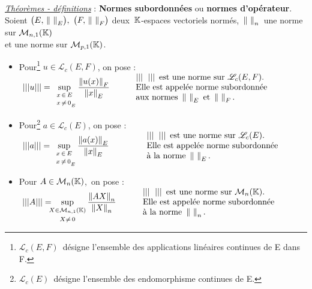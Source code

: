 \underline{\emph{Théorèmes - définitions}} : \textbf{Normes subordonnées} ou \textbf{normes d'opérateur}.\vspace{0.1cm}\\
Soient \(\bigl(E,\,\norm{\ }_E\bigr),\ \bigl(F,\,\norm{\ }_F\bigr)\) deux \(\,\mathbb{K}\)-espaces vectoriels normés, \(\displaystyle\,\left\lVert\ \right\rVert_n\,\) une norme sur \(\mathcal{M}_{n,1}(\mathbb{K})\)\vspace{0.1cm}\\
et \normtxt{\ } une norme sur \(\mathcal{M}_{p,1}(\mathbb{K})\).
\begin{itemize}[leftmargin=0cm, label=•]
    \item Pour\footnote{\(\mathscr{L}_c(E,F)\,\) désigne l'ensemble des applications linéaires continues de E dans F.} \(u\in \mathscr{L}_c(E,F)\), on pose : \(\displaystyle \ \lvert\lvert\lvert u \rvert\rvert\rvert=\sup_{\substack{x\,\in\, E\vspace{0.1cm} \\ \ \, x\,\neq\, 0_{_E}}}\frac{\norm{u(x)}_F}{\norm{x}_E}\qquad \ \;
    \begin{array}{l}
        \lvert\lvert\lvert \ \; \rvert\rvert\rvert \, \text{ est une norme sur } \mathscr{L}_c(E,F). \\
        \text{Elle est appelée norme subordonnée} \\
        \text{aux normes } \norm{\ }_E\text{ et }\norm{\ }_F.
    \end{array}\)
    
    \item Pour\footnote{\(\mathscr{L}_c(E)\,\) désigne l'ensemble des endomorphisme continues de E.} \(a\in \mathscr{L}_c(E)\), on pose : \(\displaystyle \ \lvert\lvert\lvert a \rvert\rvert\rvert=\sup_{\substack{x\,\in\, E\vspace{0.1cm} \\ \ \,x\,\neq\, 0_{_E}}}\frac{\norm{a(x)}_E}{\norm{x}_E}\qquad\qquad
    \begin{array}{l}
        \lvert\lvert\lvert \ \; \rvert\rvert\rvert \, \text{ est une norme sur } \mathscr{L}_c(E). \\
        \text{Elle est appelée norme subordonnée} \\
        \text{à la norme } \norm{\ }_E.
    \end{array}\)
    
    \item Pour \(A\in \mathcal{M}_n(\mathbb{K})\),\, on pose : \(\ \displaystyle \left\lvert\left\lvert\left\lvert A \right\rvert\right\rvert\right\rvert =\hspace{-0.2cm} \sup_{\substack{X\in \mathcal{M}_{n,1}(\KK)\vspace{0.1cm} \\ X\neq\, 0}} \frac{\norm{AX}_n}{\norm{X}_n}\qquad \ \
    \begin{array}{l}
        \lvert\lvert\lvert \ \; \rvert\rvert\rvert \, \text{ est une norme sur } \mathcal{M}_n(\KK). \\
        \text{Elle est appelée norme subordonnée} \\
        \text{à la norme } \norm{\ }_n.
    \end{array}\)
    

\end{itemize}
